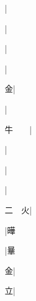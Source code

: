 \begin{multicols}{2}
{{\cjk{}{\cnsym{}　}{\cnsym{}　}{\cnsym{}　}}|{}\par
{}|{}\par
{\cjk{}{\cnsym{}　}{\cnsym{}　}{\cnsym{}　}}|{}\par
{\cjk{}{\cnsym{}　}{\cnsym{}　}{\cnsym{}　}}|{}\par
{\cjk{}{\cnsym{}　}{\cnsym{}　}金}|{}\par
{\cjk{}{\cnsym{}　}{\cnsym{}　}{\cnsym{}　}}|{}\par
{\cjk{}牛{\cnsym{}　}{\cnsym{}　}}|{}\par
{\cjk{}{\cnsym{}　}{\cnsym{}　}{\cnsym{}　}}|{}\par
{\cjk{}{\cnsym{}　}{\cnsym{}　}{\cnsym{}　}}|{}\par
{\cjk{}{\cnsym{}　}{\cnsym{}　}{\cnsym{}　}}|{}\par
{\cjk{}二{\cnsym{}　}火}|{}\par
{\cjk{}{\cnsym{}　}{\cnsym{}　}{\cnsym{}　}}|{\cjk{}曄}\par
{\cjk{}{\cnsym{}　}{\cnsym{}　}{\cnsym{}　}}|{\cjk{}曅}\par
{\cjk{}{\cnsym{}　}{\cnsym{}　}金}|{}\par
{\cjk{}{\cnsym{}　}{\cnsym{}　}立}|{}\par
}
\end{multicols}
